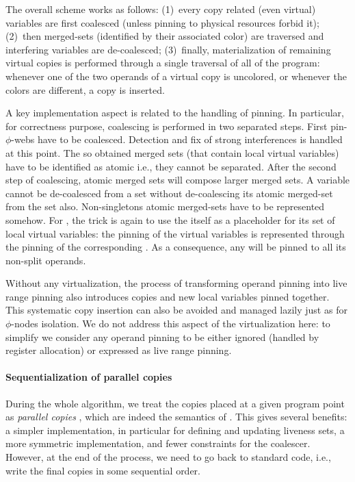         
The overall scheme works as follows: 
(1)~every copy related (even virtual) variables are first coalesced (unless pinning to physical resources forbid it); 
(2)~then merged-sets (identified by their associated color) are traversed and interfering variables are de-coalesced; 
(3)~finally, materialization of remaining virtual copies is performed through a single traversal of all \phifuns of the program: 
whenever one of the two operands of a virtual copy is uncolored, or whenever the colors are different, a copy is inserted.

A key implementation aspect is related to the handling of pinning. 
In particular, for correctness purpose, coalescing is performed in two separated steps. 
First pin-$\phi$-webs have to be coalesced. 
Detection and fix of strong interferences is handled at this point. 
The so obtained merged sets (that contain local virtual variables) have to be identified as atomic i.e., they cannot be separated. 
After the second step of coalescing, atomic merged sets will compose larger merged sets. 
A variable cannot be de-coalesced from a set without de-coalescing its atomic merged-set from the set also. 
Non-singletons atomic merged-sets have to be represented somehow. 
For \phifuns, the trick is again to use the \phifun itself as a placeholder for its set of local virtual variables: 
the pinning of the virtual variables is represented through the pinning of the corresponding \phifun. 
As a consequence, any \phifun will be pinned to all its non-split operands.

Without any virtualization, the process of transforming operand pinning into live range pinning also introduces copies and new local variables pinned together. 
This systematic copy insertion can also be avoided and managed lazily just as for $\phi$-nodes isolation. 
We do not address this aspect of the virtualization here: 
to simplify we consider any operand pinning to be either ignored (handled by register allocation) or expressed as live range pinning.





\paragraph{Sequentialization of parallel copies}          
During the whole algorithm, we treat the copies placed at a given program point as \emph{parallel copies} , which are indeed the semantics of \phifuns. 
This gives several benefits: 
a simpler implementation, in particular for defining and updating liveness sets, a more symmetric implementation, and fewer constraints for the coalescer. 
However, at the end of the process, we need to go back to standard code, i.e., write the final copies in some sequential order.

